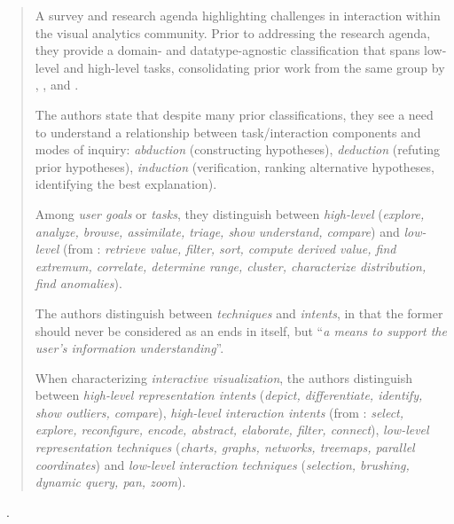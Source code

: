 \begin{quotation}
    A survey and research agenda highlighting challenges in interaction within the visual analytics community.
    Prior to addressing the research agenda, they provide a domain- and datatype-agnostic classification that spans low-level and high-level tasks, consolidating prior work from the same group by \citet{Amar2004}, \citet{Amar2005}, and \citet{Yi2007}.
    
    The authors state that despite many prior classifications, they see a need to understand a relationship between task/interaction components and modes of inquiry: {\it abduction} (constructing hypotheses), {\it deduction} (refuting prior hypotheses), {\it induction} (verification, ranking alternative hypotheses, identifying the best explanation).
    
    Among {\it user goals} or {\it tasks}, they distinguish between {\it high-level} ({\it explore, analyze, browse, assimilate, triage, show understand, compare}) and {\it low-level} (from \citet{Amar2005}: {\it retrieve value, filter, sort, compute derived value, find extremum, correlate, determine range, cluster, characterize distribution, find anomalies}).
    
    The authors distinguish between {\it techniques} and {\it intents}, in that the former should never be considered as an ends in itself, but    ``{\it a means to support the user's information understanding}''.
    
    When characterizing {\it interactive visualization}, the authors distinguish between {\it high-level representation intents} ({\it depict, differentiate, identify, show outliers, compare}),  {\it high-level interaction intents} (from \citet{Yi2007}: {\it select, explore, reconfigure, encode, abstract, elaborate, filter, connect}), {\it low-level representation techniques} ({\it charts, graphs, networks, treemaps, parallel coordinates}) and {\it low-level interaction techniques} ({\it selection, brushing, dynamic query, pan, zoom}).
\end{quotation}

\begin{sloppypar}
~\cite{Klein2006a}. \end{sloppypar}

